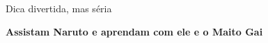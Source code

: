 \documentclass[]{beamer}
\begin{document}
\begin{frame}{Dica divertida, mas séria}

  \textbf{\Huge{Assistam Naruto e aprendam com ele e o Maito
    Gai}}

\end{frame}





































\end{document}

